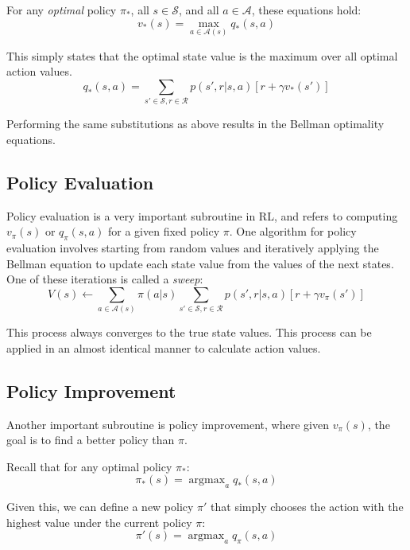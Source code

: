 \documentclass{article}
\DeclareMathOperator*{\argmax}{argmax}
\begin{document}
For any \emph{optimal} policy $\pi_*$, all $s \in \mathcal{S}$, and all $a \in \mathcal{A}$, these equations hold:
\begin{equation}
  v_*(s) = \max_{a \in \mathcal{A}(s)} q_*(s,a)
\end{equation}

This simply states that the optimal state value is the maximum over all optimal action values.
\begin{equation}
  q_*(s,a) = \sum_{s' \in \mathcal{S}, r \in \mathcal{R}} p(s',r|s,a)[r + \gamma v_*(s')]
\end{equation}

Performing the same substitutions as above results in the Bellman optimality equations.

\subsection{Policy Evaluation}
Policy evaluation is a very important subroutine in RL, and refers to computing $v_\pi(s)$ or $q_\pi(s,a)$ for a given fixed policy $\pi$.
One algorithm for policy evaluation involves starting from random values and iteratively applying the Bellman equation to update each state value from the values of
the next states. One of these iterations is called a \emph{sweep}:
\begin{equation}
  V(s) \leftarrow \sum_{a \in \mathcal{A}(s)} \pi(a|s) \sum_{s' \in \mathcal{S}, r \in \mathcal{R}} p(s',r|s,a)[r + \gamma v_\pi(s')]
\end{equation}

This process always converges to the true state values. This process can be applied in an almost identical manner to calculate action values.

\subsection{Policy Improvement}
Another important subroutine is policy improvement, where given $v_\pi(s)$, the goal is to find a better policy than $\pi$.

Recall that for any optimal policy $\pi_*$:
\begin{equation*}
  \pi_*(s) = \argmax_a q_*(s,a)
\end{equation*}

Given this, we can define a new policy $\pi'$ that simply chooses the action with the highest value under the current policy $\pi$:
\begin{equation}
  \pi'(s) = \argmax_a q_\pi(s,a)
\end{equation}
\end{document}
